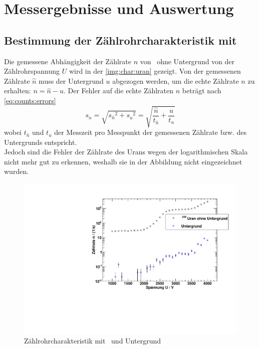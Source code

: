 \section{Messergebnisse und Auswertung}

\subsection{Bestimmung der Zählrohrcharakteristik mit \uran}
\label{sub:eval:uran}
Die gemessene Abhängigkeit der Zählrate $n$ von \uran\, ohne Untergrund von der Zählrohrspannung $U$ wird in der \autoref{img:char:uran} gezeigt.
Von der gemessenen Zählrate $\hat{n}$ muss der Untergrund $u$ abgezogen werden, um die echte Zählrate $n$ zu erhalten: $n = \hat{n}- u$. Der 
Fehler auf die echte Zählraten $n$ beträgt nach \autoref{eq:counts:errors}
\begin{equation}
  s_n=\sqrt{s_{\hat{n}}{}^2+s_u{}^2}=\sqrt{\frac{\hat{n}}{t_{\hat{n}}}+\frac{u}{t_u}}
\end{equation}
wobei $t_{\hat{n}}$ und $t_u$ der Messzeit pro Messpunkt der gemessenen Zählrate bzw. des Untergrunds entspricht. \\
Jedoch sind die Fehler der Zählrate des Urans wegen der logarithmischen Skala nicht mehr gut zu erkennen, weshalb sie in der Abbildung nicht 
eingezeichnet wurden.
\begin{figure}[H]
\begin{center}
  \includegraphics[width=15cm]{../img/Uran238_Charakteristik.pdf}
  \caption[Zählrohrcharakteristik mit \uran]{Zählrohrcharakteristik mit \uran\, und Untergrund}
  \label{img:char:uran}
\end{center}
\end{figure}
